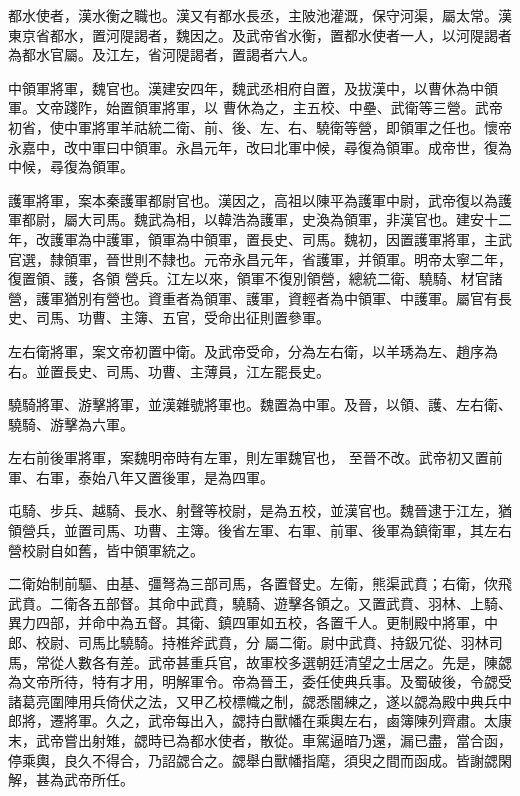 \begin{pinyinscope}
 都水使者，漢水衡之職也。漢又有都水長丞，主陂池灌溉，保守河渠，屬太常。漢東京省都水，置河隄謁者，魏因之。及武帝省水衡，置都水使者一人，以河隄謁者為都水官屬。及江左，省河隄謁者，置謁者六人。



 中領軍將軍，魏官也。漢建安四年，魏武丞相府自置，及拔漢中，以曹休為中領軍。文帝踐阼，始置領軍將軍，以
 曹休為之，主五校、中壘、武衛等三營。武帝初省，使中軍將軍羊祜統二衛、前、後、左、右、驍衛等營，即領軍之任也。懷帝永嘉中，改中軍曰中領軍。永昌元年，改曰北軍中候，尋復為領軍。成帝世，復為中候，尋復為領軍。



 護軍將軍，案本秦護軍都尉官也。漢因之，高祖以陳平為護軍中尉，武帝復以為護軍都尉，屬大司馬。魏武為相，以韓浩為護軍，史渙為領軍，非漢官也。建安十二年，改護軍為中護軍，領軍為中領軍，置長史、司馬。魏初，因置護軍將軍，主武官選，隸領軍，晉世則不隸也。元帝永昌元年，省護軍，并領軍。明帝太寧二年，復置領、護，各領
 營兵。江左以來，領軍不復別領營，總統二衛、驍騎、材官諸營，護軍猶別有營也。資重者為領軍、護軍，資輕者為中領軍、中護軍。屬官有長史、司馬、功曹、主簿、五官，受命出征則置參軍。



 左右衛將軍，案文帝初置中衛。及武帝受命，分為左右衛，以羊琇為左、趙序為右。並置長史、司馬、功曹、主薄員，江左罷長史。



 驍騎將軍、游擊將軍，並漢雜號將軍也。魏置為中軍。及晉，以領、護、左右衛、驍騎、游擊為六軍。



 左右前後軍將軍，案魏明帝時有左軍，則左軍魏官也，
 至晉不改。武帝初又置前軍、右軍，泰始八年又置後軍，是為四軍。



 屯騎、步兵、越騎、長水、射聲等校尉，是為五校，並漢官也。魏晉逮于江左，猶領營兵，並置司馬、功曹、主簿。後省左軍、右軍、前軍、後軍為鎮衛軍，其左右營校尉自如舊，皆中領軍統之。



 二衛始制前驅、由基、彊弩為三部司馬，各置督史。左衛，熊渠武賁；右衛，佽飛武賁。二衛各五部督。其命中武賁，驍騎、遊擊各領之。又置武賁、羽林、上騎、異力四部，并命中為五督。其衛、鎮四軍如五校，各置千人。更制殿中將軍，中郎、校尉、司馬比驍騎。持椎斧武賁，分
 屬二衛。尉中武賁、持鈒冗從、羽林司馬，常從人數各有差。武帝甚重兵官，故軍校多選朝廷清望之士居之。先是，陳勰為文帝所待，特有才用，明解軍令。帝為晉王，委任使典兵事。及蜀破後，令勰受諸葛亮圍陣用兵倚伏之法，又甲乙校標幟之制，勰悉闇練之，遂以勰為殿中典兵中郎將，遷將軍。久之，武帝每出入，勰持白獸幡在乘輿左右，鹵簿陳列齊肅。太康末，武帝嘗出射雉，勰時已為都水使者，散從。車駕逼暗乃還，漏已盡，當合函，停乘輿，良久不得合，乃詔勰合之。勰舉白獸幡指麾，須臾之間而函成。皆謝勰閑解，甚為武帝所任。




\end{pinyinscope}
